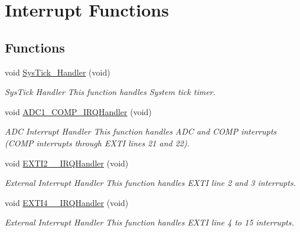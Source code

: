 \hypertarget{group___s_d___interrupt___functions}{}\section{Interrupt Functions}
\label{group___s_d___interrupt___functions}
\subsection*{Functions}
\begin{DoxyCompactItemize}
\item 
\mbox{\label{group___s_d___interrupt___functions_gab5e09814056d617c521549e542639b7e}} 
void \mbox{\hyperlink{group___s_d___interrupt___functions_gab5e09814056d617c521549e542639b7e}{Sys\+Tick\+\_\+\+Handler}} (void)
\begin{DoxyCompactList}\small\item\em Sys\+Tick Handler This function handles System tick timer. \end{DoxyCompactList}\item 
\mbox{\label{group___s_d___interrupt___functions_ga66180d7bef479114519b508f6d2beb10}} 
void \mbox{\hyperlink{group___s_d___interrupt___functions_ga66180d7bef479114519b508f6d2beb10}{A\+D\+C1\+\_\+\+C\+O\+M\+P\+\_\+\+I\+R\+Q\+Handler}} (void)
\begin{DoxyCompactList}\small\item\em A\+DC Interrupt Handler This function handles A\+DC and C\+O\+MP interrupts (C\+O\+MP interrupts through E\+X\+TI lines 21 and 22). \end{DoxyCompactList}\item 
void \mbox{\hyperlink{group___s_d___interrupt___functions_gae00a10bd0f2f4c129c84120e78ad4382}{E\+X\+T\+I2\+\_\+\_\+\+I\+R\+Q\+Handler}} (void)
\begin{DoxyCompactList}\small\item\em External Interrupt Handler This function handles E\+X\+TI line 2 and 3 interrupts. \end{DoxyCompactList}\item 
void \mbox{\hyperlink{group___s_d___interrupt___functions_ga3595b205bdfadf55a525f2d4f438d122}{E\+X\+T\+I4\+\_\+\_\+\+I\+R\+Q\+Handler}} (void)
\begin{DoxyCompactList}\small\item\em External Interrupt Handler This function handles E\+X\+TI line 4 to 15 interrupts. \end{DoxyCompactList}\item 

\end{DoxyCompactItemize}
